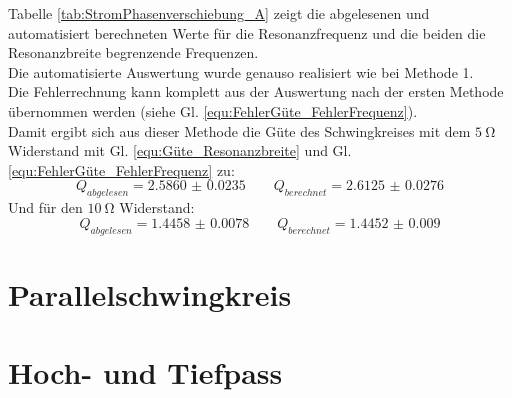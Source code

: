 \documentclass[12pt,a4paper]{article}
\begin{document}
Tabelle \ref{tab:StromPhasenverschiebung_A} zeigt die abgelesenen und automatisiert berechneten Werte für die Resonanzfrequenz und die beiden die Resonanzbreite begrenzende Frequenzen. \\
Die automatisierte Auswertung wurde genauso realisiert wie bei Methode 1. \\
Die Fehlerrechnung kann komplett aus der Auswertung nach der ersten Methode übernommen werden (siehe Gl. \ref{equ:FehlerGüte_FehlerFrequenz}). \\
Damit ergibt sich aus dieser Methode die Güte des Schwingkreises mit dem $\SI{5}{\ohm}$ Widerstand mit Gl. \ref{equ:Güte_Resonanzbreite} und Gl. \ref{equ:FehlerGüte_FehlerFrequenz} zu:
\begin{equation*}
Q_{abgelesen} = \num{2.5860(235)} \qquad Q_{berechnet} = \num{2.6125(276)}
\end{equation*}
Und für den $\SI{10}{\ohm}$ Widerstand:
\begin{equation*}
Q_{abgelesen} = \num{1.4458(78)} \qquad Q_{berechnet} = \num{1.4452(90)}
\end{equation*}



\section{Parallelschwingkreis}

\section{Hoch- und Tiefpass}
\end{document}
